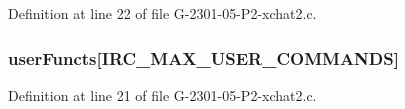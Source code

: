 Definition at line 22 of file G-\/2301-\/05-\/\-P2-\/xchat2.\-c.

\hypertarget{_g-2301-05-_p2-xchat2_8c_abe79a286412486fd4694376263d47045}{
\subsubsection[{user\-Functs}]{ user\-Functs\mbox{[}I\-R\-C\-\_\-\-M\-A\-X\-\_\-\-U\-S\-E\-R\-\_\-\-C\-O\-M\-M\-A\-N\-D\-S\mbox{]}}}\label{_g-2301-05-_p2-xchat2_8c_abe79a286412486fd4694376263d47045}


Definition at line 21 of file G-\/2301-\/05-\/\-P2-\/xchat2.\-c.

